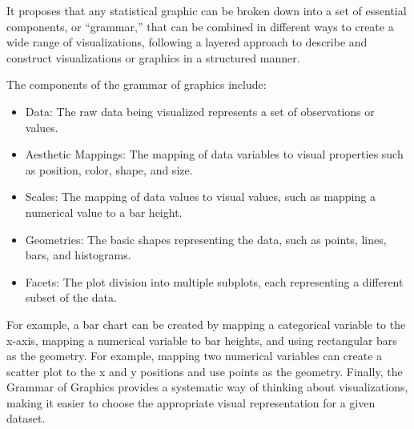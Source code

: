 \documentclass[print]{nuthesis}
\providecommand{\tightlist}{%
  \setlength{\itemsep}{0pt}\setlength{\parskip}{0pt}}
\begin{document}
It proposes that any statistical graphic can be broken down into a set of essential components, or ``grammar,'' that can be combined in different ways to create a wide range of visualizations, following a layered approach to describe and construct visualizations or graphics in a structured manner.

The components of the grammar of graphics include:

\begin{itemize}
\tightlist
\item
  Data: The raw data being visualized represents a set of observations or values.
\item
  Aesthetic Mappings: The mapping of data variables to visual properties such as position, color, shape, and size.
\item
  Scales: The mapping of data values to visual values, such as mapping a numerical value to a bar height.
\item
  Geometries: The basic shapes representing the data, such as points, lines, bars, and histograms.
\item
  Facets: The plot division into multiple subplots, each representing a different subset of the data.
\end{itemize}

For example, a bar chart can be created by mapping a categorical variable to the x-axis, mapping a numerical variable to bar heights, and using rectangular bars as the geometry.
For example, mapping two numerical variables can create a scatter plot to the x and y positions and use points as the geometry.
Finally, the Grammar of Graphics provides a systematic way of thinking about visualizations, making it easier to choose the appropriate visual representation for a given dataset.
\end{document}
